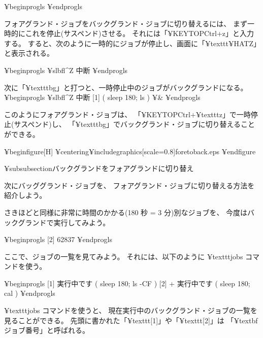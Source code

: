 ¥begin{progls}
¥end{progls}

フォアグランド・ジョブをバックグランド・ジョブに切り替えるには、
まず一時的にこれを停止(サスペンド)させる。
それには「¥KEYTOP{Ctrl}+z」と入力する。
すると、次のように一時的にジョブが停止し、画面に「¥texttt{{¥HAT}Z}」と表示される。

¥begin{progls}
¥slbfl{^Z}
中断
%
¥end{progls}

次に「¥texttt{bg}」と打つと、一時停止中のジョブがバックグランドになる。
¥begin{progls}
¥slbfl{^Z}
中断
[1]    ( sleep 180; ls ) ¥&
%
¥end{progls}

このようにフォアグランド・ジョブは、
「¥KEYTOP{Ctrl}+¥texttt{z}」で一時停止(サスペンド)し、
「¥texttt{bg}」でバックグランド・ジョブに切り替えることができる。

¥begin{figure}[H]
¥centering{¥includegraphics[scale=0.8]{foretoback.eps}}
¥end{figure}

¥subsubsection{バックグランドをフォアグランドに切り替え}

次にバッググランド・ジョブを、
フォアグランド・ジョブに切り替える方法を紹介しよう。

さきほどと同様に非常に時間のかかる(180 秒 = 3 分)別なジョブを、
今度はバックグランドで実行してみよう。

¥begin{progls}
[2] 62837
%
¥end{progls}

ここで、ジョブの一覧を見てみよう。
それには、以下のように ¥texttt{jobs} コマンドを使う。

¥begin{progls}
[1]    実行中です                    ( sleep 180; ls -CF )
[2]  + 実行中です                    ( sleep 180; cal )
¥end{progls}

¥texttt{jobs} コマンドを使うと、
現在実行中のバックグランド・ジョブの一覧を見ることができる。
先頭に書かれた「¥texttt{[1]}」や「¥texttt{[2]}」は
「¥textbf{ジョブ番号}」と呼ばれる。

